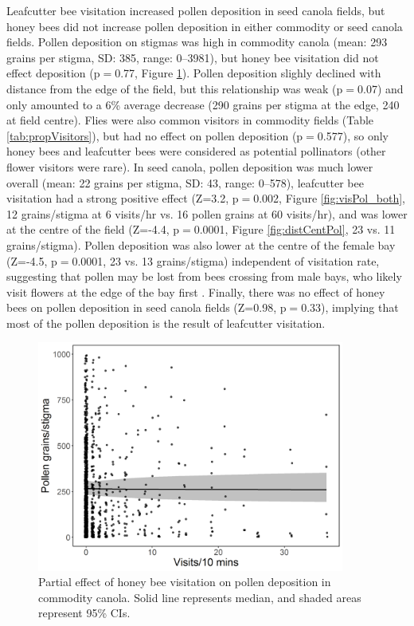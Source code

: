 \documentclass[12pt, draft]{article} %
\begin{document}
Leafcutter bee visitation increased pollen deposition in seed canola fields, but honey bees did not increase pollen deposition in either commodity or seed canola fields.
Pollen deposition on stigmas was high in commodity canola (mean: 293 grains per stigma, SD: 385, range: 0--3981), but honey bee visitation did not effect deposition (p$=$0.77, Figure \ref{fig:hbeeVisPol}).
Pollen deposition slighly declined with distance from the edge of the field, but this relationship was weak (p$=$0.07) and only amounted to a 6\% average decrease (290 grains per stigma at the edge, 240 at field centre).
Flies were also common visitors in commodity fields (Table \ref{tab:propVisitors}), but had no effect on pollen deposition (p$=$0.577), so only honey bees and leafcutter bees were considered as potential pollinators (other flower visitors were rare).
In seed canola, pollen deposition was much lower overall (mean: 22 grains per stigma, SD: 43, range: 0--578), leafcutter bee visitation had a strong positive effect (Z=3.2, p$=$0.002, Figure \ref{fig:visPol_both}, 12 grains/stigma at 6 visits/hr vs. 16 pollen grains at 60 visits/hr), and was lower at the centre of the field (Z=-4.4, p$=$0.0001, Figure \ref{fig:distCentPol}, 23 vs. 11 grains/stigma).
Pollen deposition was also lower at the centre of the female bay (Z=-4.5, p$=$0.0001, 23 vs. 13 grains/stigma) independent of visitation rate, suggesting that pollen may be lost from bees crossing from male bays, who likely visit flowers at the edge of the bay first \citep{pinnisch1990}. 
Finally, there was no effect of honey bees on pollen deposition in seed canola fields (Z=0.98, p$=$0.33), implying that most of the pollen deposition is the result of leafcutter visitation. 

\begin{figure}
    \centering
    \includegraphics[width=0.9\textwidth,keepaspectratio=true]{slopeHbeeVisPol.png}
    \caption[Partial effect of honey bee visitation on pollen deposition in commodity canola]{Partial effect of honey bee visitation on pollen deposition in commodity canola. Solid line represents median, and shaded areas represent 95\% CIs.}
    \label{fig:hbeeVisPol}
\end{figure}
\end{document}
